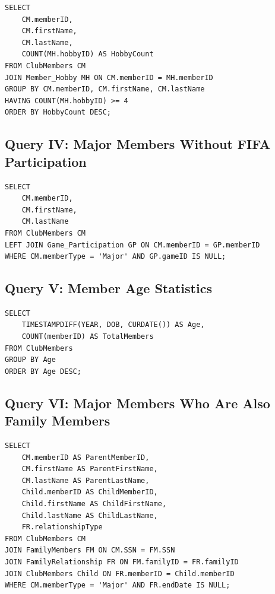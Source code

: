 \documentclass[11pt,a4paper]{article}
\begin{document}
\begin{verbatim}
SELECT 
    CM.memberID,
    CM.firstName,
    CM.lastName,
    COUNT(MH.hobbyID) AS HobbyCount
FROM ClubMembers CM
JOIN Member_Hobby MH ON CM.memberID = MH.memberID
GROUP BY CM.memberID, CM.firstName, CM.lastName
HAVING COUNT(MH.hobbyID) >= 4
ORDER BY HobbyCount DESC;
\end{verbatim}


\subsection{Query IV: Major Members Without FIFA Participation}

\begin{verbatim}
SELECT 
    CM.memberID,
    CM.firstName,
    CM.lastName
FROM ClubMembers CM
LEFT JOIN Game_Participation GP ON CM.memberID = GP.memberID
WHERE CM.memberType = 'Major' AND GP.gameID IS NULL;
\end{verbatim}


\subsection{Query V: Member Age Statistics}

\begin{verbatim}
SELECT 
    TIMESTAMPDIFF(YEAR, DOB, CURDATE()) AS Age,
    COUNT(memberID) AS TotalMembers
FROM ClubMembers
GROUP BY Age
ORDER BY Age DESC;
\end{verbatim}


\subsection{Query VI: Major Members Who Are Also Family Members}

\begin{verbatim}
SELECT 
    CM.memberID AS ParentMemberID,
    CM.firstName AS ParentFirstName,
    CM.lastName AS ParentLastName,
    Child.memberID AS ChildMemberID,
    Child.firstName AS ChildFirstName,
    Child.lastName AS ChildLastName,
    FR.relationshipType
FROM ClubMembers CM
JOIN FamilyMembers FM ON CM.SSN = FM.SSN
JOIN FamilyRelationship FR ON FM.familyID = FR.familyID
JOIN ClubMembers Child ON FR.memberID = Child.memberID
WHERE CM.memberType = 'Major' AND FR.endDate IS NULL;
\end{verbatim}
\end{document}
